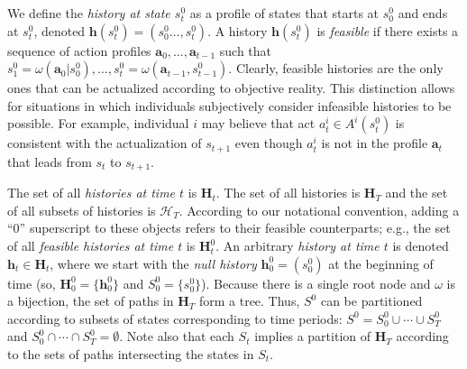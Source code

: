 \documentclass[
11pt,
titlepage,
reqno,
]{article}%
\theoremstyle{definition}
\begin{document}
	We define the \textit{history at state $s^0_t$} as a profile of states that starts at $s^0_0$ and ends at $s^0_t$, denoted $\mathbf{h}(s^0_t)=(s^0_0\ldots,s^0_t)$.
	A history $\mathbf{h}(s^0_t)$ is \textit{feasible} if there exists a sequence of action profiles $\mathbf{a}_0,\ldots,\mathbf{a}_{t-1}$ such that $s^0_1=\omega(\mathbf{a}_0|s^0_0),\ldots, s^0_t=\omega(\mathbf{a}_{t-1},s^0_{t-1})$.
	Clearly, feasible histories are the only ones that can be actualized according to objective reality.
	This distinction allows for situations in which individuals subjectively consider infeasible histories to be possible. 
	For example, individual $i$ may believe that act $a^i_t\in A^i(s^0_t)$ is consistent with the actualization of $s_{t+1}$ even though $a^i_t$ is not in the profile $\mathbf{a}_t$ that leads from $s_t$ to $s_{t+1}$.
	
	The set of all \textit{histories at time $t$} is $\mathbf{H}_t$.
	The set of all histories is $\mathbf{H}_T$ and the set of all subsets of histories is $\mathcal{H}_T$.
	According to our notational convention, adding a ``0'' superscript to these objects refers to their feasible counterparts; e.g., the set of all \textit{feasible histories at time $t$} is $\mathbf{H}^0_t$.
	An arbitrary \textit{history at time $t$} is denoted $\mathbf{h}_t\in \mathbf{H}_t$, where we start with the \textit{null history} $\mathbf{h}^0_0=(s^0_0)$ at the beginning of time (so, $\mathbf{H}^0_0=\{\mathbf{h}^0_0\}$ and  $S^0_0=\{s^0_0\}$).   
	Because there is a single root node and $\omega$ is a bijection, the set of paths in $\mathbf{H}_T$ form a tree.
	Thus, $S^0$ can be partitioned according to  subsets of states corresponding to time periods: $S^0=S^0_0\cup\cdots\cup S^0_T$ and $S^0_0\cap\cdots\cap S^0_T = \emptyset$.
	Note also that each $S_t$ implies a partition of $\mathbf{H}_T$ according to the sets of paths intersecting the states in $S_t$.

	 
\end{document}
